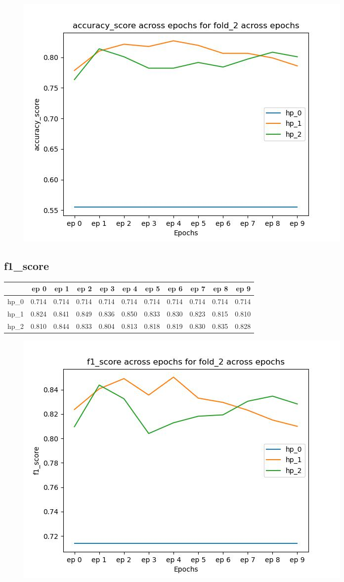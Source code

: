 \documentclass{article}
\begin{document}
\begin{figure}[H]
\includegraphics[scale = 0.75]{fold_2/accuracy_score}
\end{figure}
\subsection{f1\_score}
\begin{tabular}{lrrrrrrrrrr}
\toprule
{} &   ep 0 &   ep 1 &   ep 2 &   ep 3 &   ep 4 &   ep 5 &   ep 6 &   ep 7 &   ep 8 &   ep 9 \\
\midrule
hp\_0 &  0.714 &  0.714 &  0.714 &  0.714 &  0.714 &  0.714 &  0.714 &  0.714 &  0.714 &  0.714 \\
hp\_1 &  0.824 &  0.841 &  0.849 &  0.836 &  0.850 &  0.833 &  0.830 &  0.823 &  0.815 &  0.810 \\
hp\_2 &  0.810 &  0.844 &  0.833 &  0.804 &  0.813 &  0.818 &  0.819 &  0.830 &  0.835 &  0.828 \\
\bottomrule
\end{tabular}

\begin{figure}[H]
\includegraphics[scale = 0.75]{fold_2/f1_score}
\end{figure}
\end{document}
